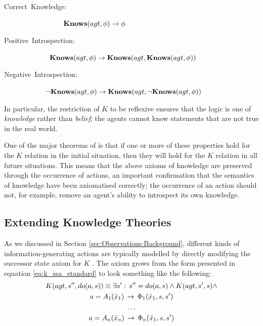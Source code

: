 \begin{description}
\item [{{{{{{{{{{{{{{{Correct~Knowledge:}}}}}}}}}}}}}}}] ~~~~~~~~~~~$\mathbf{Knows}(agt,\phi)\rightarrow\phi$ 
\item [{{{{{{{{{{{{{{{Positive~Introspection:}}}}}}}}}}}}}}}] ~~~~~~~$\mathbf{Knows}(agt,\phi)\rightarrow\mathbf{Knows}(agt,\mathbf{Knows}(agt,\phi))$ 
\item [{{{{{{{{{{{{{{{Negative~Introspection:}}}}}}}}}}}}}}}] ~~~~~~$\neg\mathbf{Knows}(agt,\phi)\rightarrow\mathbf{Knows}(agt,\neg\mathbf{Knows}(agt,\phi))$ 
\end{description}
In particular, the restriction of $K$ to be reflexive ensures that
the logic is one of \emph{knowledge} rather than \emph{belief}; the
agents cannot know statements that are not true in the real world.

One of the major theorems of \citep{scherl03sc_knowledge} is that
if one or more of these properties hold for the $K$ relation in the
initial situation, then they will hold for the $K$ relation in all
future situations. This means that the above axioms of knowledge are
preserved through the occurrence of actions, an important confirmation
that the semantics of knowledge have been axiomatised correctly; the
occurrence of an action should not, for example, remove an agent's
ability to introspect its own knowledge.


\subsection{Extending Knowledge Theories\label{sec:Knowledge:Extending}}

As we discussed in Section \ref{sec:Observations:Background}, different
kinds of information-generating actions are typically modelled by
directly modifying the successor state axiom for $K$ \citep{shapiro98specifying_ma_systems,Lesperance99sitcalc_approach,shapiro01casl_feat_inter,Petrick06thesis,shapiro07sc_goal_change}.
The axiom grows from the form presented in equation \eqref{eq:k_ssa_standard}
to look something like the following:\begin{gather*}
K(agt,s'',do(a,s))\equiv\exists s':\, s''=do(a,s)\wedge K(agt,s',s)\wedge\\
a=A_{1}(\bar{x}_{1})\,\rightarrow\,\Phi_{1}(\bar{x}_{1},s,s')\\
\dots\\
a=A_{n}(\bar{x}_{n})\,\rightarrow\,\Phi_{n}(\bar{x}_{1},s,s')\end{gather*}


